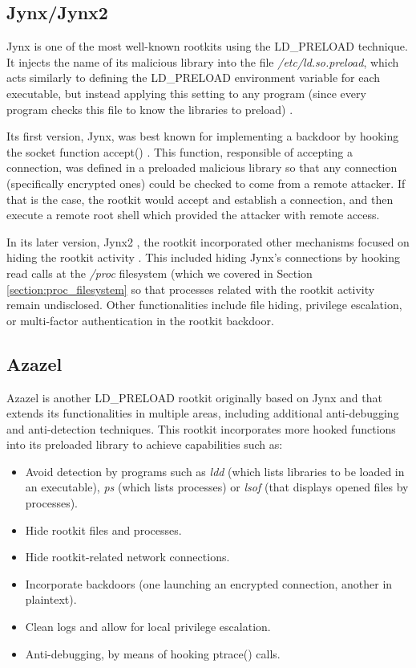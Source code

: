 \subsection{Jynx/Jynx2} Jynx \cite{jynx_github} is one of the most
well-known rootkits using the LD\_PRELOAD technique. It injects the name of
its malicious library into the file \textit{/etc/ld.so.preload}, which acts
similarly to defining the LD\_PRELOAD environment variable for each
executable, but instead applying this setting to any program (since every
program checks this file to know the libraries to preload)
\cite{ldpreload_so_jynx}.

Its first version, Jynx, was best known for implementing a backdoor by
hooking the socket function accept() \cite{ldpreload_pros_2327}. This
function, responsible of accepting a connection, was defined in a preloaded
malicious library so that any connection (specifically encrypted ones)
could be checked to come from a remote attacker. If that is the case, the
rootkit would accept and establish a connection, and then execute a remote
root shell which provided the attacker with remote access.

In its later version, Jynx2 \cite{jynx2_github}, the rootkit incorporated
other mechanisms focused on hiding the rootkit activity
\cite{jynx2_infosecinstitute}. This included hiding Jynx's connections by
hooking read calls at the \textit{/proc} filesystem (which we covered in
Section \ref{section:proc_filesystem} so that processes related with the
rootkit activity remain undisclosed. Other functionalities include file
hiding, privilege escalation, or multi-factor authentication in the rootkit
backdoor.

\subsection{Azazel}
Azazel is another LD\_PRELOAD rootkit originally based on Jynx and that
extends its functionalities in multiple areas, including additional
anti-debugging and anti-detection techniques. This rootkit incorporates
more hooked functions into its preloaded library to achieve capabilities
such as:
\begin{itemize}
\item Avoid detection by programs such as \textit{ldd} (which lists
libraries to be loaded in an executable), \textit{ps} (which lists
processes) or \textit{lsof} (that displays opened files by processes).
\item Hide rootkit files and processes.
\item Hide rootkit-related network connections.
\item Incorporate backdoors (one launching an encrypted connection, another in plaintext).
\item Clean logs and allow for local privilege escalation.
\item Anti-debugging, by means of hooking ptrace() calls.
\end{itemize}

